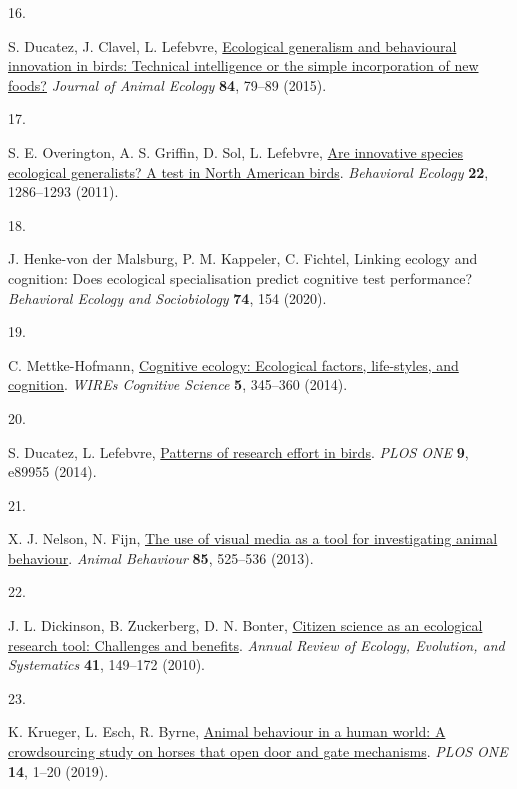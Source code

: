\documentclass[
  man,floatsintext]{apa6}
\newlength{\cslhangindent}
\newlength{\csllabelwidth}
\newlength{\cslentryspacingunit} %
\newenvironment{CSLReferences}[2] %
 {%
  \setlength{\parindent}{0pt}
  \ifodd #1
  \let\oldpar\par
  \def\par{\hangindent=\cslhangindent\oldpar}
  \fi
  \setlength{\parskip}{#2\cslentryspacingunit}
 }%
 {}
\newcommand{\CSLLeftMargin}[1]{\parbox[t]{\csllabelwidth}{#1}}
\newcommand{\CSLRightInline}[1]{\parbox[t]{\linewidth - \csllabelwidth}{#1}\break}
\begin{document}
\begin{CSLReferences}{0}{0}
\leavevmode{}%
\CSLLeftMargin{16. }%
\CSLRightInline{S. Ducatez, J. Clavel, L. Lefebvre, \href{https://doi.org/10.1111/1365-2656.12255}{Ecological generalism and behavioural innovation in birds: Technical intelligence or the simple incorporation of new foods?} \emph{Journal of Animal Ecology} \textbf{84}, 79--89 (2015).}

\leavevmode{}%
\CSLLeftMargin{17. }%
\CSLRightInline{S. E. Overington, A. S. Griffin, D. Sol, L. Lefebvre, \href{https://doi.org/10.1093/beheco/arr130}{Are innovative species ecological generalists? A test in {N}orth {A}merican birds}. \emph{Behavioral Ecology} \textbf{22}, 1286--1293 (2011).}

\leavevmode{}%
\CSLLeftMargin{18. }%
\CSLRightInline{J. Henke-von der Malsburg, P. M. Kappeler, C. Fichtel, Linking ecology and cognition: Does ecological specialisation predict cognitive test performance? \emph{Behavioral Ecology and Sociobiology} \textbf{74}, 154 (2020).}

\leavevmode{}%
\CSLLeftMargin{19. }%
\CSLRightInline{C. Mettke-Hofmann, \href{https://doi.org/10.1002/wcs.1289}{Cognitive ecology: Ecological factors, life-styles, and cognition}. \emph{WIREs Cognitive Science} \textbf{5}, 345--360 (2014).}

\leavevmode{}%
\CSLLeftMargin{20. }%
\CSLRightInline{S. Ducatez, L. Lefebvre, \href{https://doi.org/10.1371/journal.pone.0089955}{Patterns of research effort in birds}. \emph{PLOS ONE} \textbf{9}, e89955 (2014).}

\leavevmode{}%
\CSLLeftMargin{21. }%
\CSLRightInline{X. J. Nelson, N. Fijn, \href{https://doi.org/10.1016/j.anbehav.2012.12.009}{The use of visual media as a tool for investigating animal behaviour}. \emph{Animal Behaviour} \textbf{85}, 525--536 (2013).}

\leavevmode{}%
\CSLLeftMargin{22. }%
\CSLRightInline{J. L. Dickinson, B. Zuckerberg, D. N. Bonter, \href{https://doi.org/10.1146/annurev-ecolsys-102209-144636}{Citizen science as an ecological research tool: Challenges and benefits}. \emph{Annual Review of Ecology, Evolution, and Systematics} \textbf{41}, 149--172 (2010).}

\leavevmode{}%
\CSLLeftMargin{23. }%
\CSLRightInline{K. Krueger, L. Esch, R. Byrne, \href{https://doi.org/10.1371/journal.pone.0218954}{Animal behaviour in a human world: A crowdsourcing study on horses that open door and gate mechanisms}. \emph{PLOS ONE} \textbf{14}, 1--20 (2019).}


\end{CSLReferences}
\end{document}

